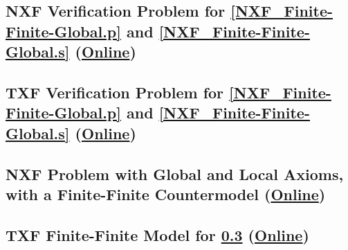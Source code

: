 \documentclass{easychair}
\begin{document}
\begin{minipage}{\textwidth}
\subsection{NXF Verification Problem for \ref{NXF_Finite-Finite-Global.p} and 
\ref{NXF_Finite-Finite-Global.s}
(\href{https://raw.githubusercontent.com/GeoffsPapers/InterpretationFormat/master/Examples/NXF_Finite-Finite-Global.s.NXF.p}{Online})}
\label{NXF_Finite-Finite-Global.s.NXF.p}
\begin{tiny}

\end{tiny}
\end{minipage}

\begin{minipage}{\textwidth}
\subsection{TXF Verification Problem for \ref{NXF_Finite-Finite-Global.p} and 
\ref{NXF_Finite-Finite-Global.s}
(\href{https://raw.githubusercontent.com/GeoffsPapers/InterpretationFormat/master/Examples/NXF_Finite-Finite-Global.s.p}{Online})}
\label{NXF_Finite-Finite-Global.s.p}
\begin{tiny}

\end{tiny}
\end{minipage}

\newpage
\begin{minipage}{\textwidth}
\subsection{NXF Problem with Global and Local Axioms, \\
            with a Finite-Finite Countermodel
(\href{https://raw.githubusercontent.com/GeoffsPapers/InterpretationFormat/master/Examples/NXF_Finite-Finite-Local.p}{Online})}
\label{NXF_Finite-Finite-Local.p}
\begin{small}

\end{small}
\end{minipage}

\begin{minipage}{\textwidth}
\subsection{TXF Finite-Finite Model for \ref{NXF_Finite-Finite-Local.p}
(\href{https://raw.githubusercontent.com/GeoffsPapers/InterpretationFormat/master/Examples/NXF_Finite-Finite-Local.s}{Online})}
\label{NXF_Finite-Finite-Local.s}
\begin{small}

\end{small}
\end{minipage}
\end{document}
